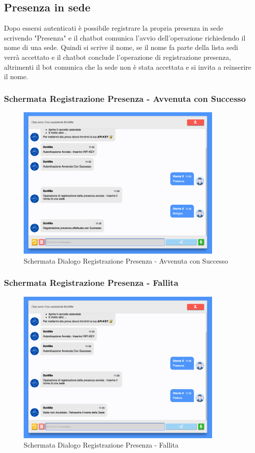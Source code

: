 \subsection{Presenza in sede}
Dopo essersi autenticati è possibile registrare la propria presenza in sede scrivendo "Presenza" e il chatbot comunica l'avvio dell'operazione richiedendo il nome di una sede. 
Quindi si scrive il nome, se il nome fa parte della lista sedi verrà accettato e il chatbot conclude l'operazione di registrazione presenza, altrimenti il bot comunica che la sede non è stata accettata e si invita a reinserire il nome. 
\subsubsection{Schermata Registrazione Presenza - Avvenuta con Successo}
\begin{figure}[H]
    \centering\includegraphics[width=0.9\textwidth, height=0.7\textheight, keepaspectratio]{images/schermata_presenza_successo.png}
    \caption{Schermata Dialogo Registrazione Presenza - Avvenuta con Successo}
\end{figure}

\subsubsection{Schermata Registrazione Presenza - Fallita}
\begin{figure}[H]
    \centering\includegraphics[width=0.9\textwidth, height=0.7\textheight, keepaspectratio]{images/schermata_presenza_fallita.png}
    \caption{Schermata Dialogo Registrazione Presenza - Fallita}
\end{figure}